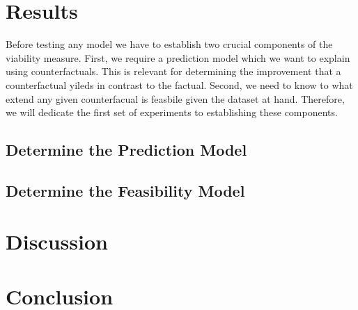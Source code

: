 \documentclass[12pt,a4paper]{report}
\begin{document}
\chapter{Results}
\label{sec:results}

Before testing any model we have to establish two crucial components of the viability measure. First, we require a prediction model which we want to explain using counterfactuals. This is relevant for determining the improvement that a counterfactual yileds in contrast to the factual. Second, we need to know to what extend any given counterfacual is feasbile given the dataset at hand. Therefore, we will dedicate the first set of experiments to establishing these components.

\section{Determine the Prediction Model}


\section{Determine the Feasibility Model}












\chapter{Discussion}
\label{sec:dicussion}


\chapter{Conclusion}
\label{sec:conclusion}


\printbibliography

\appendix
\end{document}
